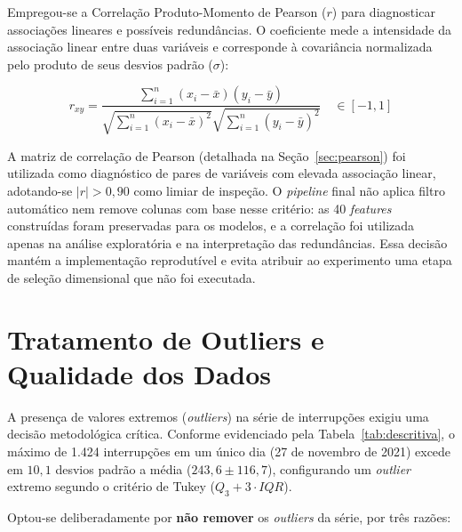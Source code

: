 Empregou-se a Correlação Produto-Momento de Pearson ($r$) para diagnosticar associações lineares e possíveis redundâncias. O coeficiente mede a intensidade da associação linear entre duas variáveis e corresponde à covariância normalizada pelo produto de seus desvios padrão ($\sigma$):

\begin{equation}
    r_{xy} = \frac{\sum_{i=1}^{n} (x_i - \bar{x})(y_i - \bar{y})}{\sqrt{\sum_{i=1}^{n} (x_i - \bar{x})^2} \sqrt{\sum_{i=1}^{n} (y_i - \bar{y})^2}} \quad \in [-1, 1]
\end{equation}

A matriz de correlação de Pearson (detalhada na Seção~\ref{sec:pearson}) foi utilizada como diagnóstico de pares de variáveis com elevada associação linear, adotando-se $|r| > 0{,}90$ como limiar de inspeção. O \textit{pipeline} final não aplica filtro automático nem remove colunas com base nesse critério: as 40 \textit{features} construídas foram preservadas para os modelos, e a correlação foi utilizada apenas na análise exploratória e na interpretação das redundâncias. Essa decisão mantém a implementação reprodutível e evita atribuir ao experimento uma etapa de seleção dimensional que não foi executada.



\section{Tratamento de Outliers e Qualidade dos Dados}\label{sec:outliers}

A presença de valores extremos (\textit{outliers}) na série de interrupções exigiu uma decisão metodológica crítica. Conforme evidenciado pela Tabela~\ref{tab:descritiva}, o máximo de 1.424 interrupções em um único dia (27 de novembro de 2021) excede em $10{,}1$ desvios padrão a média ($243{,}6 \pm 116{,}7$), configurando um \textit{outlier} extremo segundo o critério de Tukey ($Q_3 + 3 \cdot IQR$).

Optou-se deliberadamente por \textbf{não remover} os \textit{outliers} da série, por três razões:

